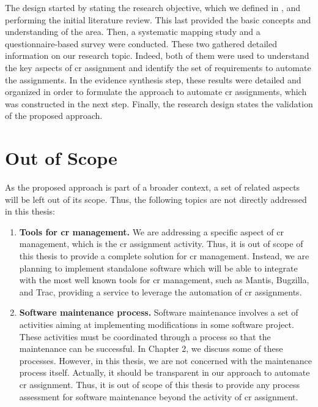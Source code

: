 {The design started by stating the research objective, which we defined in
, and performing the initial literature
review. This last provided the basic concepts and understanding of the area.
Then, a systematic mapping study and a questionnaire-based survey were
conducted. These two gathered detailed information on our research topic.
Indeed, both of them were used to understand the key aspects of \ac{cr}
assignment and identify the set of requirements to automate the assignments. In
the evidence synthesis step, these results were detailed and organized in order
to formulate the approach to automate \ac{cr} assignments, which was constructed
in the next step. Finally, the research design states the validation of the
proposed approach.

\section{Out of Scope}

As the proposed approach is part of a broader context, a set of related aspects
will be left out of its scope. Thus, the following topics are not directly
addressed in this thesis:

\begin{enumerate}
  \item \textbf{Tools for \ac{cr} management.} We are addressing
  a specific aspect of \ac{cr} management, which is the \ac{cr} assignment
  activity. Thus, it is out of scope of this thesis to provide a
  complete solution for \ac{cr} management. Instead, we are planning to
  implement standalone software which will be able to integrate with the
  most well known tools for \ac{cr} management, such as Mantis, Bugzilla, and
  Trac, providing a service to leverage the automation of \ac{cr}
  assignments.
  
  \item \textbf{Software maintenance process.} Software maintenance involves
  a set of activities aiming at implementing modifications in some software
  project. These activities must be coordinated through a process so that the
  maintenance can be successful. In Chapter 2, we discuss some of
  these processes. However, in this thesis, we are not concerned with the
  maintenance process itself. Actually, it should be transparent in our approach
  to automate \ac{cr} assignment. Thus, it is out of scope of this
  thesis to provide any process assessment for software maintenance beyond the
  activity of \ac{cr} assignment.
  

\end{enumerate}}
